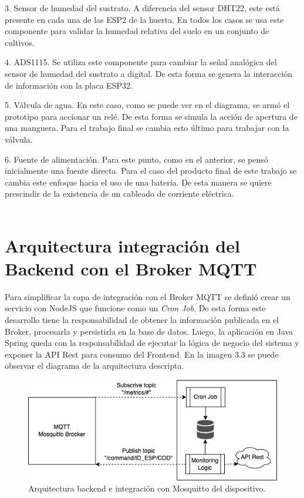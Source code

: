 3. Sensor de humedad del sustrato. A diferencia del sensor DHT22, este está presente en cada una de las ESP2 de la huerta. En todos los casos se usa este componente para validar la humedad relativa del suelo en un conjunto de cultivos.

4. ADS1115. Se utiliza este componente para cambiar la señal analógica del sensor de humedad del sustrato a digital. De esta forma se genera la interacción de información con la placa ESP32.

5. Válvula de agua. En este caso, como se puede ver en el diagrama, se armó el prototipo para accionar un relé. De esta forma se simula la acción de apertura de una manguera. Para el trabajo final se cambia esto último para trabajar con la válvula.

6. Fuente de alimentación. Para este punto, como en el anterior, se pensó inicialmente una fuente directa. Para el caso del producto final de este trabajo se cambia este enfoque hacia el uso de una batería. De esta manera se quiere prescindir de la existencia de un cableado de corriente eléctrica.\\ \\


\section{Arquitectura integración del Backend con el Broker MQTT}

Para simplificar la capa de integración con el Broker MQTT se definió crear un servicio con NodeJS que funcione como un \textit{Cron Job}. De esta forma este desarrollo tiene la responsabilidad de obtener la información publicada en el Broker, procesarla y persistirla en la base de datos. Luego, la aplicación en Java Spring queda con la responsabilidad de ejecutar la lógica de negocio del sistema y exponer la API Rest para consumo del Frontend. En la imagen 3.3 se puede observar el diagrama de la arquitectura descripta.\\

\begin{figure}[htpb]
\centering 
\includegraphics[width=.9\textwidth]{./Figures/arqBE.png}
\caption{Arquitectura backend e integración con Mosquitto del dispositivo.}
\label{fig:diagBloques}
\end{figure}

